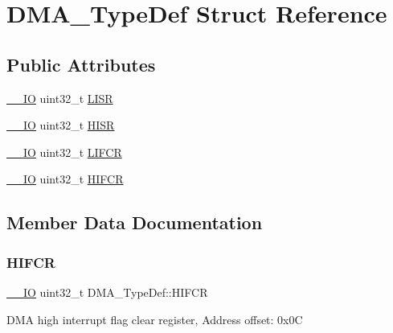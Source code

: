 \hypertarget{struct_d_m_a___type_def}{}\section{D\+M\+A\+\_\+\+Type\+Def Struct Reference}
\label{struct_d_m_a___type_def}
\subsection*{Public Attributes}
\begin{DoxyCompactItemize}
\item 
\mbox{\hyperlink{core__sc300_8h_aec43007d9998a0a0e01faede4133d6be}{\+\_\+\+\_\+\+IO}} uint32\+\_\+t \mbox{\hyperlink{struct_d_m_a___type_def_aacb4a0977d281bc809cb5974e178bc2b}{L\+I\+SR}}
\item 
\mbox{\hyperlink{core__sc300_8h_aec43007d9998a0a0e01faede4133d6be}{\+\_\+\+\_\+\+IO}} uint32\+\_\+t \mbox{\hyperlink{struct_d_m_a___type_def_a01a90a5fcd6459e10b81c0ab737dd2e3}{H\+I\+SR}}
\item 
\mbox{\hyperlink{core__sc300_8h_aec43007d9998a0a0e01faede4133d6be}{\+\_\+\+\_\+\+IO}} uint32\+\_\+t \mbox{\hyperlink{struct_d_m_a___type_def_a11adb689c874d38b49fa44990323b653}{L\+I\+F\+CR}}
\item 
\mbox{\hyperlink{core__sc300_8h_aec43007d9998a0a0e01faede4133d6be}{\+\_\+\+\_\+\+IO}} uint32\+\_\+t \mbox{\hyperlink{struct_d_m_a___type_def_a1e4f50b935bab2520788ae936f2e55c1}{H\+I\+F\+CR}}
\end{DoxyCompactItemize}


\subsection{Member Data Documentation}
\mbox{\label{struct_d_m_a___type_def_a1e4f50b935bab2520788ae936f2e55c1}} 
\subsubsection{\texorpdfstring{HIFCR}{HIFCR}}
{\footnotesize\ttfamily \mbox{\hyperlink{core__sc300_8h_aec43007d9998a0a0e01faede4133d6be}{\+\_\+\+\_\+\+IO}} uint32\+\_\+t D\+M\+A\+\_\+\+Type\+Def\+::\+H\+I\+F\+CR}

D\+MA high interrupt flag clear register, Address offset\+: 0x0C \mbox{\label{struct_d_m_a___type_def_a01a90a5fcd6459e10b81c0ab737dd2e3}} 
